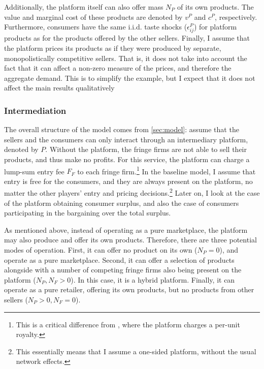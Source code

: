 \documentclass[a4paper]{article}
\begin{document}
Additionally, the platform itself can also offer mass $N_P$ of its own products.
The value and marginal cost of these products are denoted by $v^P$ and $c^P$, respectively.
Furthermore, consumers have the same i.i.d. taste shocks ($\epsilon^P_{ij}$) for platform products as for the products offered by the other sellers.
Finally, I assume that the platform prices its products as if they were produced by separate, monopolistically competitive sellers.
That is, it does not take into account the fact that it can affect a non-zero measure of the prices, and therefore the aggregate demand.
This is to simplify the example, but I expect that it does not affect the main results qualitatively

\subsubsection{Intermediation}

The overall structure of the model comes from \cref{sec:model}: assume that the sellers and the consumers can only interact through an intermediary platform, denoted by $P$.
Without the platform, the fringe firms are not able to sell their products, and thus make no profits.
For this service, the platform can charge a lump-sum entry fee $F_F$ to each fringe firm.\footnote{
    This is a critical difference from \textcite[]{anderson2021hybrid}, where the platform charges a per-unit royalty.
}
In the baseline model, I assume that entry is free for the consumers, and they are always present on the platform, no matter the other players' entry and pricing decisions.\footnote{
    This essentially means that I assume a one-sided platform, without the usual network effects.
}
Later on, I look at the case of the platform obtaining consumer surplus, and also the case of consumers participating in the bargaining over the total surplus.

As mentioned above, instead of operating as a pure marketplace, the platform may also produce and offer its own products.
Therefore, there are three potential modes of operation.
First, it can offer no product on its own ($N_P = 0$), and operate as a pure marketplace.
Second, it can offer a selection of products alongside with a number of competing fringe firms also being present on the platform ($N_P, N_F > 0$).
In this case, it is a hybrid platform.
Finally, it can operate as a pure retailer, offering its own products, but no products from other sellers ($N_P > 0, N_F = 0$).
\end{document}
